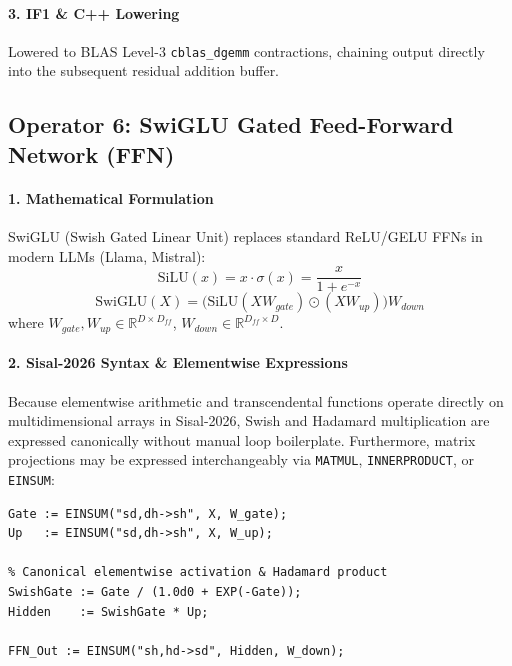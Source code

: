 \paragraph{3. IF1 \& C++ Lowering}
Lowered to BLAS Level-3 \texttt{cblas\_dgemm} contractions, chaining output directly into the subsequent residual addition buffer.

\subsection{Operator 6: SwiGLU Gated Feed-Forward Network (FFN)}
\label{subsec:op_swiglu}

\paragraph{1. Mathematical Formulation}
SwiGLU (Swish Gated Linear Unit) replaces standard ReLU/GELU FFNs in modern LLMs (Llama, Mistral):
\begin{equation}
\text{SiLU}(x) = x \cdot \sigma(x) = \frac{x}{1 + e^{-x}}
\end{equation}
\begin{equation}
\text{SwiGLU}(X) = \Big( \text{SiLU}(X W_{gate}) \odot (X W_{up}) \Big) W_{down}
\end{equation}
where $W_{gate}, W_{up} \in \mathbb{R}^{D \times D_{ff}}$, $W_{down} \in \mathbb{R}^{D_{ff} \times D}$.

\paragraph{2. Sisal-2026 Syntax \& Elementwise Expressions}
Because elementwise arithmetic and transcendental functions operate directly on multidimensional arrays in Sisal-2026, Swish and Hadamard multiplication are expressed canonically without manual loop boilerplate. Furthermore, matrix projections may be expressed interchangeably via \texttt{MATMUL}, \texttt{INNERPRODUCT}, or \texttt{EINSUM}:
\begin{lstlisting}[language=Sisal]
% Projections via EINSUM("sd,dh->sh", X, W) or MATMUL(X, W)
Gate := EINSUM("sd,dh->sh", X, W_gate);
Up   := EINSUM("sd,dh->sh", X, W_up);

% Canonical elementwise activation & Hadamard product
SwishGate := Gate / (1.0d0 + EXP(-Gate));
Hidden    := SwishGate * Up;

FFN_Out := EINSUM("sh,hd->sd", Hidden, W_down);
\end{lstlisting}

